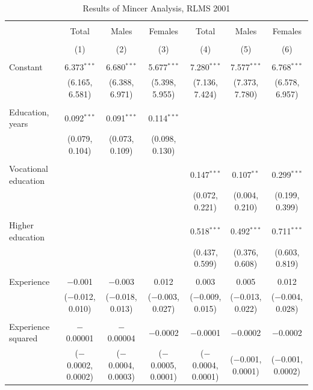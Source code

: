 \documentclass[alpha-refs]{wiley-article-01g}
\begin{document}
\begin{landscape}

\fontsize{9}{11}
\selectfont

\begin{table}[!htbp] \centering 
\renewcommand{\arraystretch}{1.0}
  \caption{Results of Mincer Analysis, RLMS 2001} 
  \label{} 
\begin{tabular}{@{\extracolsep{5pt}}lcccccc} 
\\[-1.8ex]\hline 
\hline \\[-1.8ex] 
 & Total & Males & Females & Total & Males & Females \\ 
\\[-1.8ex] & (1) & (2) & (3) & (4) & (5) & (6)\\ 
\hline \\[-1.8ex] 
 Constant & 6.373$^{***}$ & 6.680$^{***}$ & 5.677$^{***}$ & 7.280$^{***}$ & 7.577$^{***}$ & 6.768$^{***}$ \\ 
  & (6.165, 6.581) & (6.388, 6.971) & (5.398, 5.955) & (7.136, 7.424) & (7.373, 7.780) & (6.578, 6.957) \\ 
  & & & & & & \\ 
 Education, years & 0.092$^{***}$ & 0.091$^{***}$ & 0.114$^{***}$ &  &  &  \\ 
  & (0.079, 0.104) & (0.073, 0.109) & (0.098, 0.130) &  &  &  \\ 
  & & & & & & \\ 
 Vocational education &  &  &  & 0.147$^{***}$ & 0.107$^{**}$ & 0.299$^{***}$ \\ 
  &  &  &  & (0.072, 0.221) & (0.004, 0.210) & (0.199, 0.399) \\ 
  & & & & & & \\ 
 Higher education &  &  &  & 0.518$^{***}$ & 0.492$^{***}$ & 0.711$^{***}$ \\ 
  &  &  &  & (0.437, 0.599) & (0.376, 0.608) & (0.603, 0.819) \\ 
  & & & & & & \\ 
 Experience & $-$0.001 & $-$0.003 & 0.012 & 0.003 & 0.005 & 0.012 \\ 
  & ($-$0.012, 0.010) & ($-$0.018, 0.013) & ($-$0.003, 0.027) & ($-$0.009, 0.015) & ($-$0.013, 0.022) & ($-$0.004, 0.028) \\ 
  & & & & & & \\ 
 Experience squared & $-$0.00001 & $-$0.00004 & $-$0.0002 & $-$0.0001 & $-$0.0002 & $-$0.0002 \\ 
  & ($-$0.0002, 0.0002) & ($-$0.0004, 0.0003) & ($-$0.0005, 0.0001) & ($-$0.0004, 0.0001) & ($-$0.001, 0.0001) & ($-$0.001, 0.0002) \\ 

\end{tabular}
\end{table}
\end{landscape}
\end{document}

